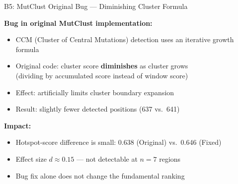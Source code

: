 \documentclass[aspectratio=169,11pt]{beamer}
\begin{document}
\begin{frame}{B5: MutClust Original Bug --- Diminishing Cluster Formula}

\textbf{Bug in original MutClust implementation:}

\vspace{1em}
\begin{itemize}
  \item CCM (Cluster of Central Mutations) detection uses an iterative growth formula
  \item Original code: cluster score \textbf{diminishes} as cluster grows\\
        (dividing by accumulated score instead of window score)
  \item Effect: artificially limits cluster boundary expansion
  \item Result: slightly fewer detected positions (637 vs.\ 641)
\end{itemize}

\vspace{1em}
\textbf{Impact:}
\begin{itemize}
  \item Hotspot-score difference is small: 0.638 (Original) vs.\ 0.646 (Fixed)
  \item Effect size $d \approx 0.15$ --- not detectable at $n = 7$ regions
  \item Bug fix alone does not change the fundamental ranking
\end{itemize}
\end{frame}
\end{document}
